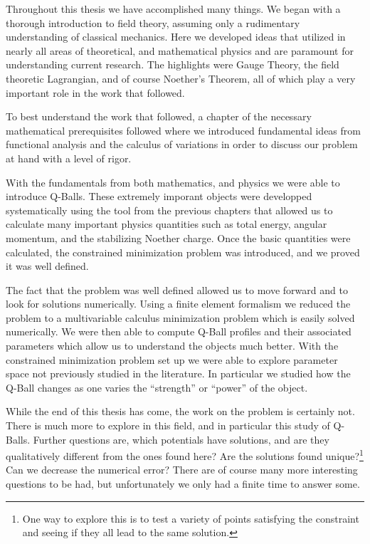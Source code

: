 Throughout this thesis we have accomplished many things. We began with a
thorough introduction to field theory, assuming only a rudimentary understanding
of classical mechanics. Here we developed ideas that utilized in nearly all
areas of theoretical, and mathematical physics and are paramount for
understanding current research. The highlights were Gauge Theory, the field
theoretic Lagrangian, and of course Noether's Theorem, all of which play a very
important role in the work that followed.

To best understand the work that followed, a chapter of the necessary
mathematical prerequisites followed where we introduced fundamental ideas from
functional analysis and the calculus of variations in order to discuss our
problem at hand with a level of rigor.

With the fundamentals from both mathematics, and physics we were able to
introduce Q-Balls. These extremely imporant objects were developped
systematically using the tool from the previous chapters that allowed us to
calculate many important physics quantities such as total energy, angular
momentum, and the stabilizing Noether charge. Once the basic quantities were
calculated, the constrained minimization problem was introduced, and we proved
it was well defined.

The fact that the problem was well defined allowed us to move forward and to
look for solutions numerically. Using a finite element formalism we reduced the
problem to a multivariable calculus minimization problem which is easily solved
numerically. We were then able to compute Q-Ball profiles and their associated
parameters which allow us to understand the objects much better. With the
constrained minimization problem set up we were able to explore parameter space
not previously studied in the literature. In particular we studied how the
Q-Ball changes as one varies the ``strength'' or ``power'' of the object.

While the end of this thesis has come, the work on the problem is certainly not.
There is much more to explore in this field, and in particular this study of
Q-Balls. Further questions are, which potentials have solutions, and are they
qualitatively different from the ones found here? Are the solutions found
unique?\footnote{One way to explore this is to test a variety of points
satisfying the constraint and seeing if they all lead to the same solution.} Can
we decrease the numerical error? There are of course many more interesting
questions to be had, but unfortunately we only had a finite time to answer some.